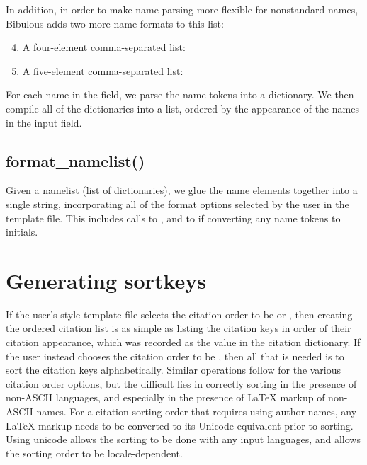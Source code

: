 \documentclass[letterpaper,10pt,english]{sphinxmanual}
\begin{document}
In addition, in order to make name parsing more flexible for nonstandard names, Bibulous adds two more name formats to this list:
\begin{enumerate}
\setcounter{enumi}{3}
\item {} 
A four-element comma-separated list: 

\item {} 
A five-element comma-separated list: 

\end{enumerate}

For each name in the field, we parse the name tokens into a dictionary. We then compile all of the dictionaries into a list, ordered by the appearance of the names in the input field.


\subsection{format\_namelist()}
\label{developer_guide:format-namelist}
Given a namelist (list of dictionaries), we glue the name elements together into a single string, incorporating all of the format options selected by the user in the template file. This includes calls to , and to  if converting any name tokens to initials.


\section{Generating sortkeys}
\label{developer_guide:generating-sortkeys}
If the user's style template file selects the citation order to be  or , then creating the ordered citation list is as simple as listing the citation keys in order of their citation appearance, which was recorded as the value in the citation dictionary. If the user instead chooses the citation order to be , then all that is needed is to sort the citation keys alphabetically. Similar operations follow for the various citation order options, but the difficult lies in correctly sorting in the presence of non-ASCII languages, and especially in the presence of LaTeX markup of non-ASCII names. For a citation sorting order that requires using author names, any LaTeX markup needs to be converted to its Unicode equivalent prior to sorting. Using unicode allows the sorting to be done with any input languages, and allows the sorting order to be locale-dependent.
\end{document}
